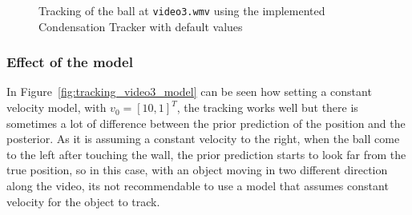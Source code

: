 \documentclass{ethz_report}
\begin{document}
\begin{figure}[h]
\begin{subfigure}[b]{.25\textwidth}
    \end{subfigure}
    \caption{Tracking of the ball at \texttt{video3.wmv} using the implemented Condensation Tracker with default values}
    \label{fig:tracking_video3}
\end{figure}

\subsubsection*{Effect of the model}

In Figure~\ref{fig:tracking_video3_model} can be seen how setting a constant velocity model, with $v_0 = [10,1]^T$, the tracking works well but there is sometimes a lot of difference between the prior prediction of the position and the posterior. As it is assuming a constant velocity to the right, when the ball come to the left after touching the wall, the prior prediction starts to look far from the true position, so in this case, with an object moving in two different direction along the video, its not recommendable to use a model that assumes constant velocity for the object to track.
\end{document}
